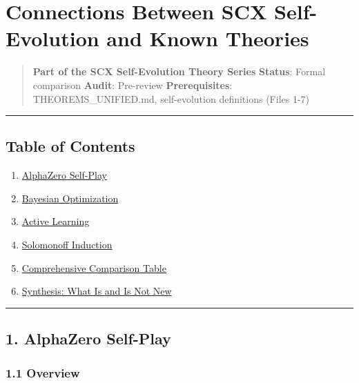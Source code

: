 \documentclass[
  12pt,
]{article}
\author{SCX}
\date{2026}
\providecommand{\tightlist}{%
  \setlength{\itemsep}{0pt}\setlength{\parskip}{0pt}}
\begin{document}
\section{Connections Between SCX Self-Evolution and Known
Theories}\label{connections-between-scx-self-evolution-and-known-theories}

\begin{quote}
\textbf{Part of the SCX Self-Evolution Theory Series} \textbf{Status}:
Formal comparison \textbar{} \textbf{Audit}: Pre-review
\textbf{Prerequisites}: THEOREMS\_UNIFIED.md, self-evolution definitions
(Files 1-7)
\end{quote}

\begin{center}\rule{0.5\linewidth}{0.5pt}\end{center}

\subsection{Table of Contents}\label{table-of-contents}

\begin{enumerate}
\def\labelenumi{\arabic{enumi}.}
\tightlist
\item
  \hyperref[1-alphazero-self-play]{AlphaZero Self-Play}
\item
  \hyperref[2-bayesian-optimization]{Bayesian Optimization}
\item
  \hyperref[3-active-learning]{Active Learning}
\item
  \hyperref[4-solomonoff-induction]{Solomonoff Induction}
\item
  \hyperref[5-comprehensive-comparison-table]{Comprehensive Comparison
  Table}
\item
  \hyperref[6-synthesis-what-is-and-is-not-new]{Synthesis: What Is and
  Is Not New}
\end{enumerate}

\begin{center}\rule{0.5\linewidth}{0.5pt}\end{center}

\subsection{1. AlphaZero Self-Play}\label{alphazero-self-play}

\subsubsection{1.1 Overview}\label{overview}
\end{document}

